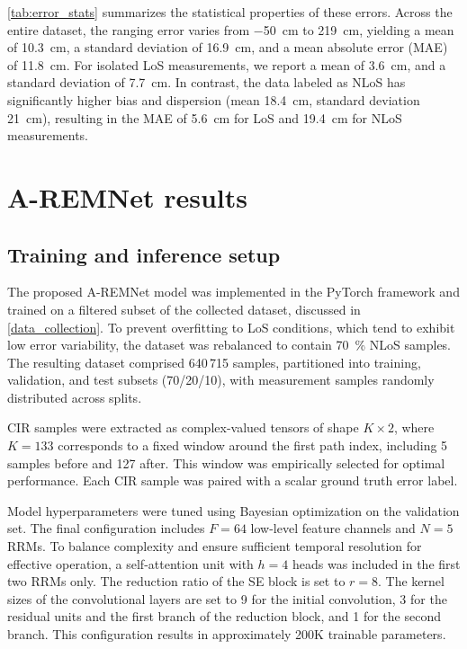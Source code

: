\autoref{tab:error_stats} summarizes the statistical properties of these errors. Across the entire dataset, the ranging error varies from \SI{-50}{\centi\metre} to \SI{219}{\centi\metre}, yielding a mean of \SI{10.3}{\centi\metre}, a standard deviation of \SI{16.9}{\centi\metre}, and a mean absolute error (MAE) of \SI{11.8}{\centi\metre}. For isolated LoS measurements, we report a mean of \SI{3.6}{\centi\metre}, and a standard deviation of \SI{7.7}{\centi\metre}. In contrast, the data labeled as NLoS has significantly higher bias and dispersion (mean \SI{18.4}{\centi\metre}, standard deviation \SI{21}{\centi\metre}), resulting in the MAE of \SI{5.6}{\centi\metre} for LoS and \SI{19.4}{\centi\metre} for NLoS measurements.

\section{A-REMNet results}
\subsection{Training and inference setup}
The proposed A-REMNet model was implemented in the PyTorch framework and trained on a filtered subset of the collected dataset, discussed in \autoref{data_collection}. To prevent overfitting to LoS conditions, which tend to exhibit low error variability, the dataset was rebalanced to contain \SI{70}{\percent} NLoS samples. The resulting dataset comprised 640\,715 samples, partitioned into training, validation, and test subsets (70/20/10), with measurement samples randomly distributed across splits.

CIR samples were extracted as complex-valued tensors of shape $K \times 2$, where $K = 133$ corresponds to a fixed window around the first path index, including 5 samples before and 127 after. This window was empirically selected for optimal performance. Each CIR sample was paired with a scalar ground truth error label.

Model hyperparameters were tuned using Bayesian optimization on the validation set. The final configuration includes $F = 64$ low-level feature channels and $N = 5$ RRMs. To balance complexity and ensure sufficient temporal resolution for effective operation, a self-attention unit with $h = 4$ heads was included in the first two RRMs only. The reduction ratio of the SE block is set to $r = 8$. The kernel sizes of the convolutional layers are set to 9 for the initial convolution, 3 for the residual units and the first branch of the reduction block, and 1 for the second branch. This configuration results in approximately 200K trainable parameters.

